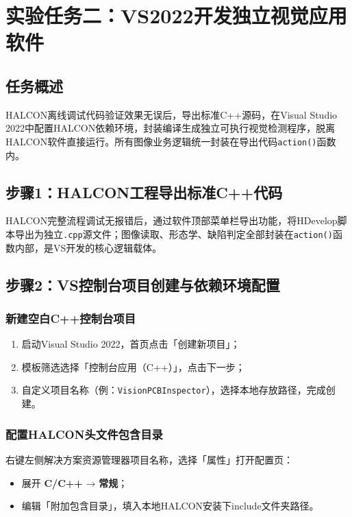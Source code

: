 \documentclass[UTF8,a4paper,12pt]{ctexart}
\begin{document}
\newpage
\section{实验任务二：VS2022开发独立视觉应用软件}
\subsection{任务概述}
HALCON离线调试代码验证效果无误后，导出标准C++源码，在Visual Studio 2022中配置HALCON依赖环境，封装编译生成独立可执行视觉检测程序，脱离HALCON软件直接运行。所有图像业务逻辑统一封装在导出代码\texttt{action()}函数内。

\subsection{步骤1：HALCON工程导出标准C++代码}
HALCON完整流程调试无报错后，通过软件顶部菜单栏导出功能，将HDevelop脚本导出为独立\texttt{.cpp}源文件；图像读取、形态学、缺陷判定全部封装在\texttt{action()}函数内部，是VS开发的核心逻辑载体。

\subsection{步骤2：VS控制台项目创建与依赖环境配置}
\subsubsection{新建空白C++控制台项目}
\begin{enumerate}
    \item 启动Visual Studio 2022，首页点击「创建新项目」；
    \item 模板筛选选择「控制台应用（C++）」，点击下一步；
    \item 自定义项目名称（例：\texttt{VisionPCBInspector}），选择本地存放路径，完成创建。
\end{enumerate}

\subsubsection{配置HALCON头文件包含目录}
右键左侧解决方案资源管理器项目名称，选择「属性」打开配置页：
\begin{itemize}
    \item 展开 \textbf{C/C++} → \textbf{常规}；
    \item 编辑「附加包含目录」，填入本地HALCON安装下include文件夹路径。
\end{itemize}
\end{document}

